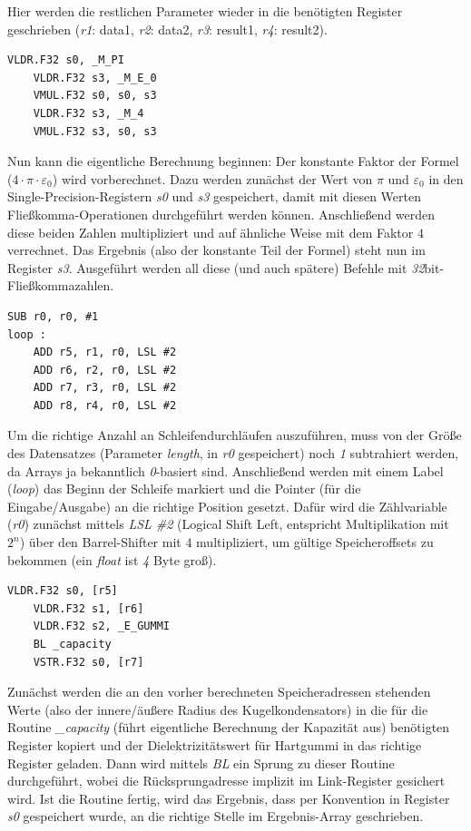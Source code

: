 \documentclass[11pt]{scrartcl}
\begin{document}
Hier werden die restlichen Parameter wieder in die benötigten Register geschrieben (\emph{r1}: data1, \emph{r2}: data2, \emph{r3}: result1, \emph{r4}: result2).
\\
\begin{lstlisting}[language={[x86masm]Assembler}]
	VLDR.F32 s0, _M_PI
	VLDR.F32 s3, _M_E_0
	VMUL.F32 s0, s0, s3
	VLDR.F32 s3, _M_4
	VMUL.F32 s3, s0, s3
\end{lstlisting}
Nun kann die eigentliche Berechnung beginnen: Der konstante Faktor der Formel ($4 \cdot \pi \cdot \varepsilon_{0}$) wird vorberechnet. Dazu werden zunächst der Wert von $\pi$ und $\varepsilon_{0}$ in den Single-Precision-Registern \emph{s0} und \emph{s3} gespeichert, damit mit diesen Werten Fließkomma-Operationen durchgeführt werden können. Anschließend werden diese beiden Zahlen multipliziert und auf ähnliche Weise mit dem Faktor $4$ verrechnet. Das Ergebnis (also der konstante Teil der Formel) steht nun im Register \emph{s3}. Ausgeführt werden all diese (und auch spätere) Befehle mit \emph{32}bit-Fließkommazahlen.
\\
\begin{lstlisting}[language={[x86masm]Assembler}]
	SUB r0, r0, #1
loop :
	ADD r5, r1, r0, LSL #2
	ADD r6, r2, r0, LSL #2
	ADD r7, r3, r0, LSL #2
	ADD r8, r4, r0, LSL #2
\end{lstlisting}
Um die richtige Anzahl an Schleifendurchläufen auszuführen, muss von der Größe des Datensatzes (Parameter \emph{length}, in \emph{r0} gespeichert) noch \emph{1} subtrahiert werden, da Arrays ja bekanntlich \emph{0}-basiert sind. Anschließend werden mit einem Label (\emph{loop}) das Beginn der Schleife markiert und die Pointer (für die Eingabe/Ausgabe) an die richtige Position gesetzt. Dafür wird die Zählvariable (\emph{r0}) zunächst mittels \emph{LSL \#2} (Logical Shift Left, entspricht Multiplikation mit $2^{n}$) über den Barrel-Shifter mit $4$ multipliziert, um gültige Speicheroffsets zu bekommen (ein \emph{float} ist \emph{4} Byte groß).
\\
\begin{lstlisting}[language={[x86masm]Assembler}]
	VLDR.F32 s0, [r5]
	VLDR.F32 s1, [r6]
	VLDR.F32 s2, _E_GUMMI
	BL _capacity
	VSTR.F32 s0, [r7]
\end{lstlisting}
Zunächst werden die an den vorher berechneten Speicheradressen stehenden Werte (also der innere/äußere Radius des Kugelkondensators) in die für die Routine \emph{\_capacity} (führt eigentliche Berechnung der Kapazität aus) benötigten Register kopiert und der Dielektrizitätswert für Hartgummi in das richtige Register geladen. Dann wird mittels \emph{BL} ein Sprung zu dieser Routine durchgeführt, wobei die Rücksprungadresse implizit im Link-Register gesichert wird. Ist die Routine fertig, wird das Ergebnis, dass per Konvention in Register \emph{s0} gespeichert wurde, an die richtige Stelle im Ergebnis-Array geschrieben.
\end{document}
